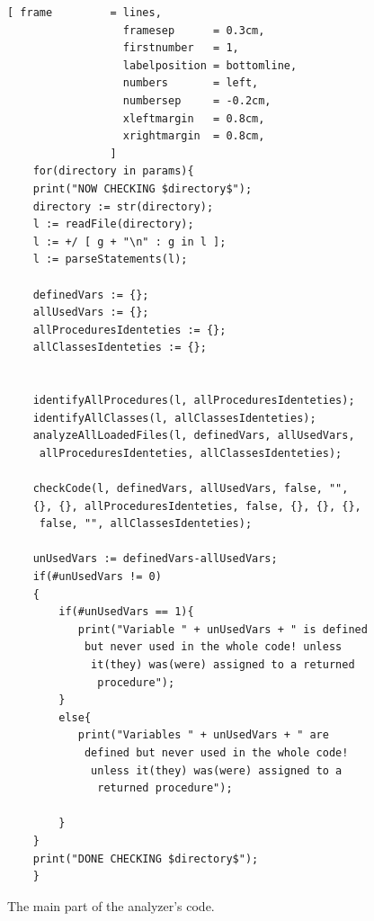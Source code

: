 \documentclass[11pt]{report}
\begin{document}
\begin{figure}[!htb]
\centering
\begin{Verbatim}[ frame         = lines, 
                  framesep      = 0.3cm, 
                  firstnumber   = 1,
                  labelposition = bottomline,
                  numbers       = left,
                  numbersep     = -0.2cm,
                  xleftmargin   = 0.8cm,
                  xrightmargin  = 0.8cm,
                ]
    for(directory in params){
	print("NOW CHECKING $directory$");
	directory := str(directory);
	l := readFile(directory); 
	l := +/ [ g + "\n" : g in l ];
	l := parseStatements(l);

	definedVars := {};
	allUsedVars := {};
	allProceduresIdenteties := {};
	allClassesIdenteties := {};
	
	
	identifyAllProcedures(l, allProceduresIdenteties);
	identifyAllClasses(l, allClassesIdenteties);
	analyzeAllLoadedFiles(l, definedVars, allUsedVars,
	 allProceduresIdenteties, allClassesIdenteties);
	
	checkCode(l, definedVars, allUsedVars, false, "", 
	{}, {}, allProceduresIdenteties, false, {}, {}, {},
	 false, "", allClassesIdenteties);
	
	unUsedVars := definedVars-allUsedVars;
	if(#unUsedVars != 0)
	{
		if(#unUsedVars == 1){
		   print("Variable " + unUsedVars + " is defined
		    but never used in the whole code! unless
		     it(they) was(were) assigned to a returned
		      procedure");
		}
		else{
		   print("Variables " + unUsedVars + " are
		    defined but never used in the whole code!
		     unless it(they) was(were) assigned to a
		      returned procedure");
		
		}
	}
	print("DONE CHECKING $directory$");
    }
\end{Verbatim}
\vspace*{-0.3cm}
\caption{The main part of the analyzer's code.}
\label{fig:startAnalyzing}
\end{figure}
\end{document}
